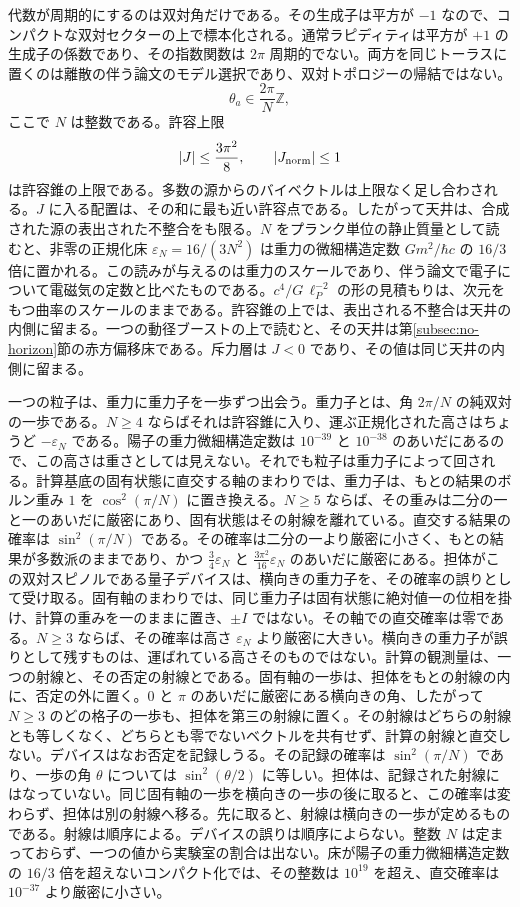 \documentclass[a4paper]{article}
\begin{document}
代数が周期的にするのは双対角だけである。その生成子は平方が $-1$ なので、コンパクトな双対セクターの上で標本化される。通常ラピディティは平方が $+1$ の生成子の係数であり、その指数関数は $2\pi$ 周期的でない。両方を同じトーラスに置くのは離散の伴う論文のモデル選択であり、双対トポロジーの帰結ではない。
\[
\theta_a \in \frac{2\pi}{N}\mathbb{Z},
\]
ここで \(N\) は整数である。許容上限
\[
|J| \le \frac{3\pi^2}{8}, \qquad |J_{\rm norm}|\le 1
\]
は許容錐の上限である。多数の源からのバイベクトルは上限なく足し合わされる。\(J\) に入る配置は、その和に最も近い許容点である。したがって天井は、合成された源の表出された不整合をも限る。\(N\) をプランク単位の静止質量として読むと、非零の正規化床 \(\varepsilon_N=16/(3N^2)\) は重力の微細構造定数 \(G m^2/\hbar c\) の \(16/3\) 倍に置かれる。この読みが与えるのは重力のスケールであり、伴う論文で電子について電磁気の定数と比べたものである。\(c^4/G\,\ell_P^{-2}\) の形の見積もりは、次元をもつ曲率のスケールのままである。許容錐の上では、表出される不整合は天井の内側に留まる。一つの動径ブーストの上で読むと、その天井は第\ref{subsec:no-horizon}節の赤方偏移床である。斥力層は \(J<0\) であり、その値は同じ天井の内側に留まる。

一つの粒子は、重力に重力子を一歩ずつ出会う。重力子とは、角 \(2\pi/N\) の純双対の一歩である。\(N\ge 4\) ならばそれは許容錐に入り、運ぶ正規化された高さはちょうど \(-\varepsilon_N\) である。陽子の重力微細構造定数は \(10^{-39}\) と \(10^{-38}\) のあいだにあるので、この高さは重さとしては見えない。それでも粒子は重力子によって回される。計算基底の固有状態に直交する軸のまわりでは、重力子は、もとの結果のボルン重み \(1\) を \(\cos^2(\pi/N)\) に置き換える。\(N\ge 5\) ならば、その重みは二分の一と一のあいだに厳密にあり、固有状態はその射線を離れている。直交する結果の確率は \(\sin^2(\pi/N)\) である。その確率は二分の一より厳密に小さく、もとの結果が多数派のままであり、かつ \(\tfrac34\varepsilon_N\) と \(\tfrac{3\pi^2}{16}\varepsilon_N\) のあいだに厳密にある。担体がこの双対スピノルである量子デバイスは、横向きの重力子を、その確率の誤りとして受け取る。固有軸のまわりでは、同じ重力子は固有状態に絶対値一の位相を掛け、計算の重みを一のままに置き、\(\pm I\) ではない。その軸での直交確率は零である。\(N\ge 3\) ならば、その確率は高さ \(\varepsilon_N\) より厳密に大きい。横向きの重力子が誤りとして残すものは、運ばれている高さそのものではない。計算の観測量は、一つの射線と、その否定の射線とである。固有軸の一歩は、担体をもとの射線の内に、否定の外に置く。\(0\) と \(\pi\) のあいだに厳密にある横向きの角、したがって \(N\ge 3\) のどの格子の一歩も、担体を第三の射線に置く。その射線はどちらの射線とも等しくなく、どちらとも零でないベクトルを共有せず、計算の射線と直交しない。デバイスはなお否定を記録しうる。その記録の確率は \(\sin^2(\pi/N)\) であり、一歩の角 \(\theta\) については \(\sin^2(\theta/2)\) に等しい。担体は、記録された射線にはなっていない。同じ固有軸の一歩を横向きの一歩の後に取ると、この確率は変わらず、担体は別の射線へ移る。先に取ると、射線は横向きの一歩が定めるものである。射線は順序による。デバイスの誤りは順序によらない。整数 \(N\) は定まっておらず、一つの値から実験室の割合は出ない。床が陽子の重力微細構造定数の \(16/3\) 倍を超えないコンパクト化では、その整数は \(10^{19}\) を超え、直交確率は \(10^{-37}\) より厳密に小さい。
\end{document}
